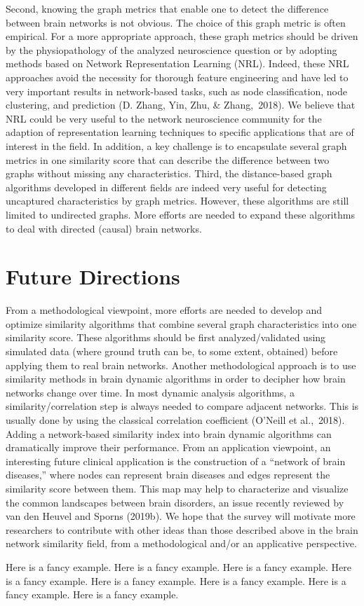 Second, knowing the graph metrics that enable one to detect the difference between brain networks is not obvious. The choice of this graph metric is often empirical. For a more appropriate approach, these graph metrics should be driven by the physiopathology of the analyzed neuroscience question or by adopting methods based on Network Representation Learning (NRL). Indeed, these NRL approaches avoid the necessity for thorough feature engineering and have led to very important results in network-based tasks, such as node classification, node clustering, and prediction (D. Zhang, Yin, Zhu, & Zhang, 2018). We believe that NRL could be very useful to the network neuroscience community for the adaption of representation learning techniques to specific applications that are of interest in the field. In addition, a key challenge is to encapsulate several graph metrics in one similarity score that can describe the difference between two graphs without missing any characteristics.
Third, the distance-based graph algorithms developed in different fields are indeed very useful for detecting uncaptured characteristics by graph metrics. However, these algorithms are still limited to undirected graphs. More efforts are needed to expand these algorithms to deal with directed (causal) brain networks.


\section{Future Directions}
From a methodological viewpoint, more efforts are needed to develop and optimize similarity algorithms that combine several graph characteristics into one similarity score. These algorithms should be first analyzed/validated using simulated data (where ground truth can be, to some extent, obtained) before applying them to real brain networks. Another methodological approach is to use similarity methods in brain dynamic algorithms in order to decipher how brain networks change over time. In most dynamic analysis algorithms, a similarity/correlation step is always needed to compare adjacent networks. This is usually done by using the classical correlation coefficient (O’Neill et al., 2018). Adding a network-based similarity index into brain dynamic algorithms can dramatically improve their performance.
From an application viewpoint, an interesting future clinical application is the construction of a “network of brain diseases,” where nodes can represent brain diseases and edges represent the similarity score between them. This map may help to characterize and visualize the common landscapes between brain disorders, an issue recently reviewed by van den Heuvel and Sporns (2019b).
We hope that the survey will motivate more researchers to contribute with other ideas than those described above in the brain network similarity field, from a methodological and/or an applicative perspective.

\begin{example}
Here is a fancy example. Here is a fancy example. Here is a fancy example. Here is a fancy example. Here is a fancy example. Here is a fancy example. Here is a fancy example. Here is a fancy example. 
\end{example}                  